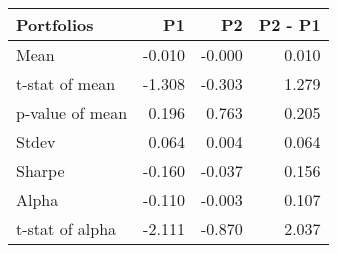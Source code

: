 \begin{tabular}{lrrr}
\toprule
Portfolios & P1 & P2 & P2 - P1 \\
\midrule
Mean & -0.010 & -0.000 & 0.010 \\
t-stat of mean & -1.308 & -0.303 & 1.279 \\
p-value of mean & 0.196 & 0.763 & 0.205 \\
Stdev & 0.064 & 0.004 & 0.064 \\
Sharpe & -0.160 & -0.037 & 0.156 \\
Alpha & -0.110 & -0.003 & 0.107 \\
t-stat of alpha & -2.111 & -0.870 & 2.037 \\
\bottomrule
\end{tabular}
